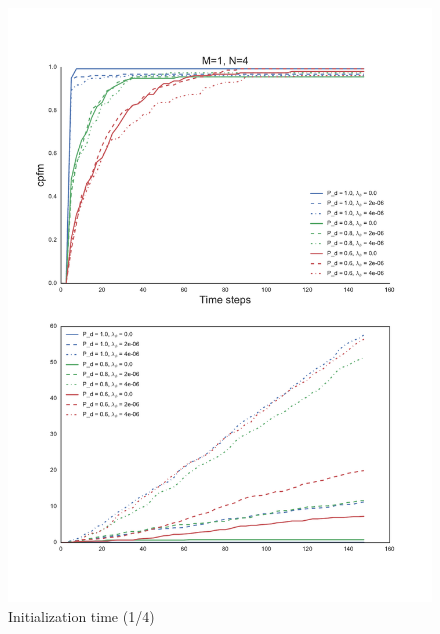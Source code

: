 \begin{figure}
\centering
\includegraphics[height = .9\textheight]{Figures/plots/Scenario1_Init-Time(1-4).pdf}
\caption{Initialization time (1/4)}\label{fig:init_time_1-4}
\end{figure}

